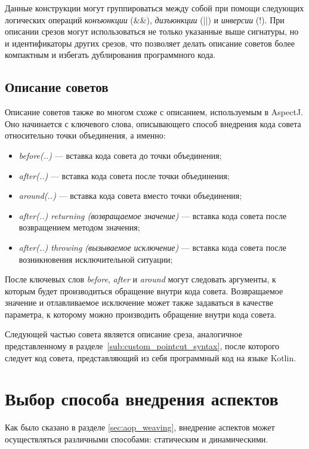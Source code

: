 Данные конструкции могут группироваться между собой при помощи следующих
логических операций \textit{конъюнкции} (\&\&),  \textit{дизъюнкции} (||)  и
\textit{инверсии} (!).
При описании срезов могут использоваться не только указанные выше сигнатуры, но
и идентификаторы других срезов, что позволяет делать описание советов более
компактным и избегать дублирования программного кода.
\subsection{Описание советов}
\label{sub:custom_advice_syntax}
Описание советов также во многом схоже с описанием, используемым в AspectJ.
Оно начинается с ключевого слова, описывающего способ внедрения
кода совета относительно точки объединения, а именно:
\begin{itemize}
	\item \textit{before(..)} --- вставка кода совета до точки объединения;
	\item \textit{after(..)} --- вставка кода совета после точки объединения;
	\item \textit{around(..)} --- вставка кода совета вместо точки объединения;
	\item \textit{after(..) returning (возвращаемое значение)} --- вставка кода совета после возвращением методом значения;
	\item \textit{after(..) throwing (вызываемое исключение)} --- вставка кода совета после возникновения исключительной ситуации;
\end{itemize}
После ключевых слов \textit{before}, \textit{after} и \textit{around} могут следовать аргументы, к которым будет производиться обращение внутри кода совета.
Возвращаемое значение и отлавливаемое исключение может также задаваться в качестве параметра, к которому можно производить обращение внутри кода совета.

Следующей частью совета является описание среза, аналогичное представленному в
разделе~\ref{sub:custom_pointcut_syntax}, после которого следует код совета,
представляющий из себя программный код на языке Kotlin.
\section{Выбор способа внедрения аспектов}
\label{sec:advice_weaving_choice}
Как было сказано в разделе \ref{sec:aop_weaving}, внедрение аспектов может осуществляться различными способами: статическим и динамическими.

